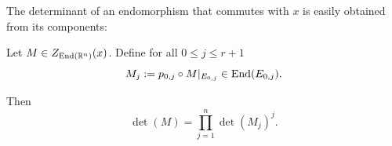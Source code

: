 \documentclass[english]{article}
\begin{document}
%

The determinant of an endomorphism that commutes with $x$ is easily obtained from its components:
\begin{proposition}\label{propno:DeterminantCentralizer}
    Let $M\in Z_{\operatorname{End}(\mathbb{R}^n)} (x)$.
    Define for all $0 \leqslant j \leqslant r+1$
    \[
        M_j:= p_{0,j}\circ M|_{E_{0,j}} \in \operatorname{End}(E_{0,j})
    .\]

    Then 
    \[
        \det(M) = \prod_{j=1}^n \det(M_j)^j
    .\]
\end{proposition}
\end{document}
